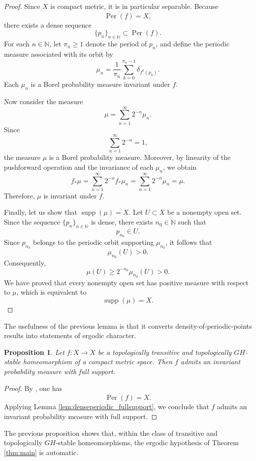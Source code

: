 \documentclass{amsart}
\numberwithin{equation}{section}
\newtheorem{proposition}[theorem]{Proposition}
\theoremstyle{remark}
\DeclareMathOperator{\supp}{supp}
\DeclareMathOperator{\Per}{Per}
\begin{document}
\begin{proof}
Since $X$ is compact metric, it is in particular separable. Because
\[
\overline{\Per(f)}=X,
\]
there exists a dense sequence
\[
\{p_n\}_{n\in\mathbb N}\subset \Per(f).
\]
For each $n\in\mathbb N$, let $\pi_n\ge 1$ denote the period of $p_n$, and define the periodic measure associated with its orbit by
\[
\mu_n
=
\frac{1}{\pi_n}\sum_{k=0}^{\pi_n-1}\delta_{f^k(p_n)}.
\]
Each $\mu_n$ is a Borel probability measure invariant under $f$.

Now consider the measure
\[
\mu=\sum_{n=1}^{\infty}2^{-n}\mu_n.
\]
Since
\[
\sum_{n=1}^{\infty}2^{-n}=1,
\]
the measure $\mu$ is a Borel probability measure. Moreover, by linearity of the pushforward operation and the invariance of each $\mu_n$, we obtain
\[
f_*\mu
=
\sum_{n=1}^{\infty}2^{-n}f_*\mu_n
=
\sum_{n=1}^{\infty}2^{-n}\mu_n
=
\mu.
\]
Therefore, $\mu$ is invariant under $f$.

Finally, let us show that $\supp(\mu)=X$. Let $U\subset X$ be a nonempty open set. Since the sequence $\{p_n\}_{n\in\mathbb N}$ is dense, there exists $n_0\in\mathbb N$ such that
\[
p_{n_0}\in U.
\]
Since $p_{n_0}$ belongs to the periodic orbit supporting $\mu_{n_0}$, it follows that
\[
\mu_{n_0}(U)>0.
\]
Consequently,
\[
\mu(U)\ge 2^{-n_0}\mu_{n_0}(U)>0.
\]
We have proved that every nonempty open set has positive measure with respect to $\mu$, which is equivalent to
\[
\supp(\mu)=X.
\]
\end{proof}

The usefulness of the previous lemma is that it converts density-of-periodic-points results into statements of ergodic character.

\begin{proposition}\label{prop:transitive_full_support_GH}
Let $f:X\to X$ be a topologically transitive and topologically $GH$-stable homeomorphism of a compact metric space. Then $f$ admits an invariant probability measure with full support.
\end{proposition}

\begin{proof}
By \cite[Theorem 3.1.4]{cubas2018propriedades}, one has
\[
\overline{\Per(f)}=X.
\]
Applying Lemma \ref{lem:denseperiodic_fullsupport}, we conclude that $f$ admits an invariant probability measure with full support.
\end{proof}

The previous proposition shows that, within the class of transitive and topologically $GH$-stable homeomorphisms, the ergodic hypothesis of Theorem \ref{thm:main} is automatic.
\end{document}
